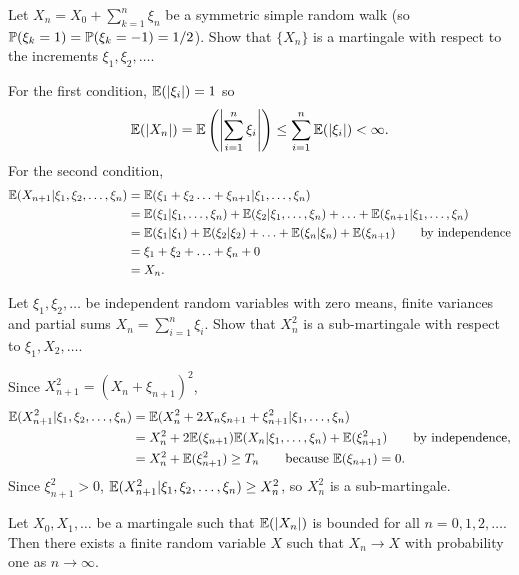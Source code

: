 \begin{example}
Let $X_n=X_0+\sum_{k=1}^n \xi_n$ be a symmetric simple random walk (so $\mathbb{P}(\xi_k=1)=\mathbb{P}(\xi_k=-1) = 1/2$). Show that $\{X_n\}$ is a martingale with respect to the increments $\xi_1,\xi_2,\ldots$.
\begin{solution}
For the first condition, $\mathbb{E}(|\xi_i|)=1$ so
\[
\mathbb{E}(|X_n|) = \mathbb{E}\left(\left|\sum_{i=1}^{n} \xi_i\right|\right) \leq \sum_{i=1}^{n} \mathbb{E}(|\xi_i|) < \infty.
\]
For the second condition,
\begin{align*}
\mathbb{E}(X_{n+1}|\xi_1,\xi_2,\ldots,\xi_n)
	& = \mathbb{E}(\xi_1+\xi_2\ldots+\xi_{n+1}|\xi_1,\ldots,\xi_n) \\
	& = \mathbb{E}(\xi_1|\xi_1,\ldots,\xi_n) + \mathbb{E}(\xi_2|\xi_1,\ldots,\xi_n) + \ldots + \mathbb{E}(\xi_{n+1}|\xi_1,\ldots,\xi_n) \\
	& = \mathbb{E}(\xi_1|\xi_1) + \mathbb{E}(\xi_2|\xi_2) + \ldots + \mathbb{E}(\xi_n|\xi_n) + \mathbb{E}(\xi_{n+1}) \qquad \text{by independence} \\
	& = \xi_1 + \xi_2 + \ldots + \xi_n + 0 \\
	& = X_n.
\end{align*}
\end{solution}
\end{example}

\begin{example}
Let $\xi_1,\xi_2,\ldots$ be independent random variables with zero means, finite variances and partial sums $X_n=\sum_{i=1}^n \xi_i$. Show that $X_n^2$ is a sub-martingale with respect to $\xi_1,X_2,\ldots$.
\begin{solution}
Since $X^2_{n+1} = (X_n + \xi_{n+1})^2$, 
\begin{align*}
\mathbb{E}(X^2_{n+1}|\xi_1,\xi_2,\ldots,\xi_n)
	& = \mathbb{E}(X_n^2 + 2X_n\xi_{n+1} + \xi_{n+1}^2 | \xi_1,\ldots,\xi_{n}) \\
	& = X^2_n + 2\mathbb{E}(\xi_{n+1})\mathbb{E}(X_n | \xi_1,\ldots,\xi_n) + \mathbb{E}(\xi_{n+1}^2) \qquad \text{by independence,} \\
	& = X^2_n + \mathbb{E}(\xi_{n+1}^2) \geq T_n \qquad\text{because $\mathbb{E}(\xi_{n+1})=0$.}
\end{align*}	
Since $\xi_{n+1}^2>0$, $\mathbb{E}(X^2_{n+1}|\xi_1,\xi_2,\ldots,\xi_n)\geq X^2_n$, so $X^2_n$ is a sub-martingale.
\end{solution}
\end{example}

\begin{theorem}
Let $X_0,X_1,\ldots$ be a martingale such that $\mathbb{E}(|X_n|)$ is bounded for all $n=0,1,2,\ldots$. Then there exists a finite random variable $X$ such that $X_n\to X$ with probability one as $n\to\infty$.
\end{theorem}

